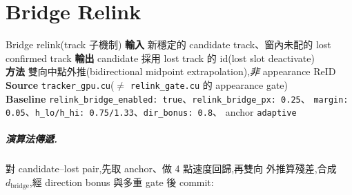 \chapter{Bridge Relink}\label{ch:relink}

\begin{center}\end{center}

\begin{contract}{Bridge relink(track 子機制)}
\textbf{輸入}\; 新穩定的 candidate track、窗內未配的 lost confirmed track\quad
\textbf{輸出}\; candidate 採用 lost track 的 id(lost slot deactivate)\\
\textbf{方法}\; 雙向中點外推(bidirectional midpoint extrapolation),\emph{非} appearance ReID\quad
\textbf{Source}\; \texttt{tracker\_gpu.cu}(\(\ne\) \texttt{relink\_gate.cu} 的 appearance gate)\\
\textbf{Baseline}\; \texttt{relink\_bridge\_enabled: true}、\texttt{relink\_bridge\_px: 0.25}、
\texttt{margin: 0.05}、\texttt{h\_lo/h\_hi: 0.75/1.33}、\texttt{dir\_bonus: 0.8}、
anchor \texttt{adaptive}
\end{contract}

\paragraph{演算法傳遞.} 對 candidate–lost pair,先取 anchor、做 4 點速度回歸,再雙向
外推算殘差,合成 \(d_{\mathrm{bridge}}\),經 direction bonus 與多重 gate 後 commit:

\begin{center}\end{center}

